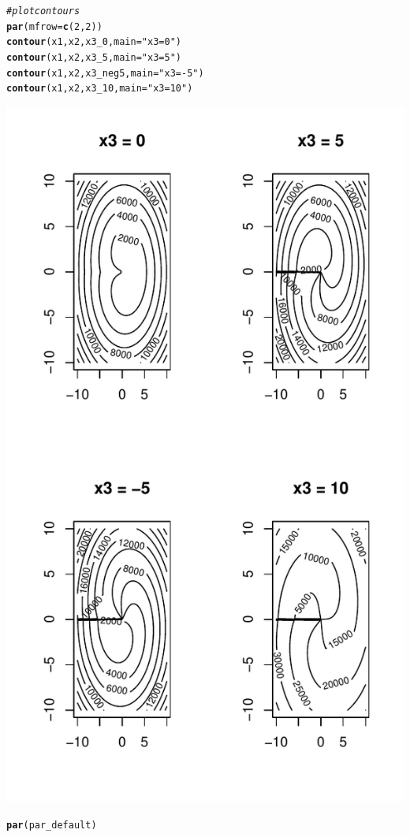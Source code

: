 \documentclass{article}\usepackage[]{graphicx}\usepackage[]{color}
\makeatletter
\def\maxwidth{ %
  \ifdim\Gin@nat@width>\linewidth
    \linewidth
  \else
    \Gin@nat@width
  \fi
}
\newcommand{\hlnum}[1]{\textcolor[rgb]{0.686,0.059,0.569}{#1}}%
\newcommand{\hlstr}[1]{\textcolor[rgb]{0.192,0.494,0.8}{#1}}%
\newcommand{\hlcom}[1]{\textcolor[rgb]{0.678,0.584,0.686}{\textit{#1}}}%
\newcommand{\hlstd}[1]{\textcolor[rgb]{0.345,0.345,0.345}{#1}}%
\newcommand{\hlkwc}[1]{\textcolor[rgb]{0.333,0.667,0.333}{#1}}%
\newcommand{\hlkwd}[1]{\textcolor[rgb]{0.737,0.353,0.396}{\textbf{#1}}}%
\newenvironment{kframe}{%
 \def\at@end@of@kframe{}%
 \ifinner\ifhmode%
  \def\at@end@of@kframe{\end{minipage}}%
  \begin{minipage}{\columnwidth}%
 \fi\fi%
 \def\FrameCommand##1{\hskip\@totalleftmargin \hskip-\fboxsep
 \colorbox{shadecolor}{##1}\hskip-\fboxsep
     \hskip-\linewidth \hskip-\@totalleftmargin \hskip\columnwidth}%
 \MakeFramed {\advance\hsize-\width
   \@totalleftmargin\z@ \linewidth\hsize
   \@setminipage}}%
 {\par\unskip\endMakeFramed%
 \at@end@of@kframe}
\newenvironment{knitrout}{}{} %
\makeatother
\begin{document}
\begin{knitrout}
\begin{kframe}
\begin{alltt}
\hlcom{#plot contours}
\hlkwd{par}\hlstd{(}\hlkwc{mfrow} \hlstd{=} \hlkwd{c}\hlstd{(}\hlnum{2}\hlstd{,} \hlnum{2}\hlstd{))}
\hlkwd{contour}\hlstd{(x1, x2, x3_0,} \hlkwc{main} \hlstd{=} \hlstr{"x3 = 0"}\hlstd{)}
\hlkwd{contour}\hlstd{(x1, x2, x3_5,} \hlkwc{main} \hlstd{=} \hlstr{"x3 = 5"}\hlstd{)}
\hlkwd{contour}\hlstd{(x1, x2, x3_neg5,} \hlkwc{main} \hlstd{=} \hlstr{"x3 = -5"}\hlstd{)}
\hlkwd{contour}\hlstd{(x1, x2, x3_10,} \hlkwc{main} \hlstd{=} \hlstr{"x3 = 10"}\hlstd{)}
\end{alltt}
\end{kframe}
\includegraphics[width=\maxwidth]{figure/unnamed-chunk-4-1} 
\begin{kframe}\begin{alltt}
\hlkwd{par}\hlstd{(par_default)}


\end{alltt}
\end{kframe}
\end{knitrout}
\end{document}
